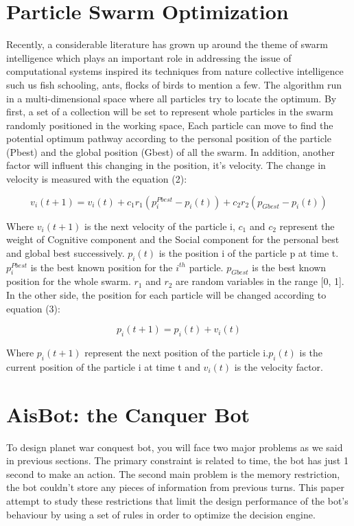 \documentclass[]{interact}
\theoremstyle{plain}%
\theoremstyle{definition}
\theoremstyle{remark}
\begin{document}
\section{Particle Swarm Optimization}
Recently, a considerable literature has grown up around the theme of swarm intelligence which plays an important role in addressing the issue of computational systems inspired its techniques from nature collective\cite{clever} intelligence such us fish schooling, ants, flocks of birds to mention a few. The algorithm run in a multi-dimensional space where all particles try to locate the optimum\cite{clever,pso}. By first, a set of a collection will be set to represent whole particles in the swarm randomly positioned in the working space\cite{pso}, Each particle can move to find the potential optimum pathway according to the personal position of the particle (Pbest)  and the global position (Gbest) of all the swarm. In addition, another factor will influent this changing in the position, it's velocity. The change in velocity is measured with the equation (2):

\begin{equation}
v_{i}(t+1) = v_{i}(t) + c_{1}r_{1}(p_{i}^{Pbest}-p_{i}(t))  + c_{2}r_{2}(p_{Gbest}-p_{i}(t))
\end{equation}

Where $v_{i}(t+1)$ is the next velocity of the particle i, $c_{1}$ and $c_{2}$ represent the weight of Cognitive component and the Social component  for the personal best and global best successively. $p_{i}(t)$ is the position i of the particle p at time t. $p_{i}^{Pbest}$ is the best known position for the $i^{th}$ particle. $p_{Gbest}$ is the best known position for the whole swarm. $r_{1}$ and $r_{2}$ are random variables in the range [0, 1]. In the other side, the position for each particle  will be changed according to equation (3):

\begin{equation}
p_{i}(t+1) = p_{i}(t) + v_{i}(t)
\end{equation}

Where $p_{i}(t+1)$ represent the next position of the particle i.$p_{i}(t)$ is the current position of the particle i at time t and $v_{i}(t)$ is the velocity factor.

\section{AisBot: the Canquer Bot}

To design planet war conquest bot, you will face two major problems as we said in previous sections. The primary constraint is related to time, the bot has just 1 second to make an action. The second main problem is the memory restriction, the bot couldn't store any pieces of information from previous turns. This paper attempt to study these restrictions that limit the design performance of the bot's behaviour by using a set of rules in order to optimize the decision engine. \\
\end{document}
